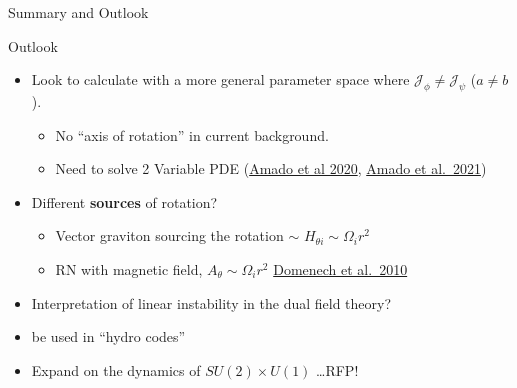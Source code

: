 \documentclass[xcolor=dvipsnames]{beamer}
\begin{document}
\begin{frame}{Summary and Outlook}

  \begin{block}{Outlook}
    \begin{itemize}
      \item
        Look to calculate with a more general parameter space where
        \(\mathcal J_\phi\neq\mathcal J_\psi\) (\(a\neq b\)).

        \begin{itemize}
          \item
            No ``axis of rotation'' in current background.
          \item
            Need to solve 2 Variable PDE (\href{https://inspirehep.net/literature/1780844}{Amado et
            al 2020}, \href{https://inspirehep.net/literature/1844790}{Amado et
            al.~2021})
        \end{itemize}
      \item
        Different \textbf{sources} of rotation?

        \begin{itemize}
          \item
            Vector graviton sourcing the rotation $\sim$ 
            \(H_{\theta i} \sim \Omega_i r^2\)
          \item
            RN with magnetic field, \(A_\theta \sim \Omega_i r^2\)
            \href{https://inspirehep.net/literature/854786}{Domenech et
            al.~2010}
        \end{itemize}
      \item
        Interpretation of linear instability in the dual field theory?
      \item
        be used in ``hydro codes''
      \item
        Expand on the dynamics of $SU(2)\times U(1)$ \ldots RFP!
    \end{itemize}
  \end{block}

\end{frame}
\end{document}
